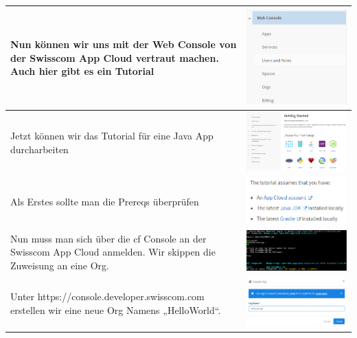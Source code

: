 \begin{longtable}{| p{5cm} | p{11cm} |}
Nun können wir uns mit der Web Console von der Swisscom App Cloud vertraut machen. Auch hier gibt es ein Tutorial 
&\includegraphics[width=0.4\columnwidth, valign=T]{images/image4.png} \\ \hline
Jetzt können wir das Tutorial für eine Java App durcharbeiten &\includegraphics[width=0.65\columnwidth, valign=T]{images/image1.png} \\ \hline
Als Erstes sollte man die Prereqs überprüfen 
&\includegraphics[width=0.5\columnwidth, valign=T]{images/image5.png} \\ \hline
Nun muss man sich über die cf Console an der Swisscom App Cloud anmelden. Wir skippen die Zuweisung an eine Org. 
&\includegraphics[width=0.65\columnwidth, valign=T]{images/image6.png} \\ \hline
Unter https://console.developer.swisscom.com erstellen wir eine neue Org Namens „HelloWorld“. &\includegraphics[width=0.65\columnwidth, valign=T]{images/image7.png} \\ \hline

\end{longtable}
